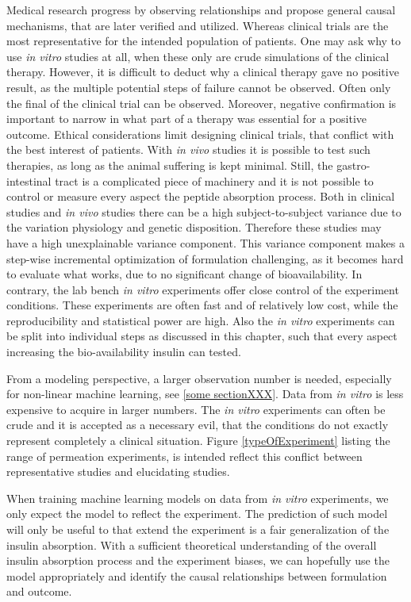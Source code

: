 Medical research progress by observing relationships and propose general causal mechanisms, that are later verified and utilized. Whereas clinical trials are the most representative for the intended population of patients. One may ask why to use \textit{in vitro} studies at all, when these only are crude simulations of the clinical therapy. However, it is difficult to deduct why a clinical therapy gave no positive result, as the multiple potential steps of failure cannot be observed. Often only the final of the clinical trial can be observed. Moreover, negative confirmation is important to narrow in what part of a therapy was essential for a positive outcome. Ethical considerations limit designing clinical trials, that conflict with the best interest of patients. With \textit{in vivo} studies it is possible to test such therapies, as long as the animal suffering is kept minimal. Still, the gastro-intestinal tract is a complicated piece of machinery and it is not possible to control or measure every aspect the peptide absorption process. Both in clinical studies and \textit{in vivo} studies there can be a high subject-to-subject variance due to the variation physiology and genetic disposition. Therefore these studies may have a high unexplainable variance component. This variance component makes a step-wise incremental optimization of formulation challenging, as it becomes hard to evaluate what works, due to no significant change of bioavailability. In contrary, the lab bench \textit{in vitro} experiments offer close control of the experiment conditions. These experiments are often fast and of relatively low cost, while the reproducibility and statistical power are high. Also the \textit{in vitro} experiments can be split into individual steps as discussed in this chapter, such that every aspect increasing the bio-availability insulin can tested.

From a modeling perspective, a larger observation number is needed, especially for non-linear machine learning, see \ref{some sectionXXX}. Data from \textit{in vitro} is less expensive to acquire in larger numbers. The \textit{in vitro} experiments can often be crude and it is accepted as a necessary evil, that the conditions do not exactly represent completely a clinical situation. Figure \ref{typeOfExperiment} listing the range of permeation experiments, is intended reflect this conflict between representative studies and elucidating studies.

When training machine learning models on data from \textit{in vitro} experiments, we only expect the model to reflect the experiment. The prediction of such model will only be useful to that extend the experiment is a fair generalization of the insulin absorption. With a sufficient theoretical understanding of the overall insulin absorption process and the experiment biases, we can hopefully use the model appropriately and identify the causal relationships between formulation and outcome.

